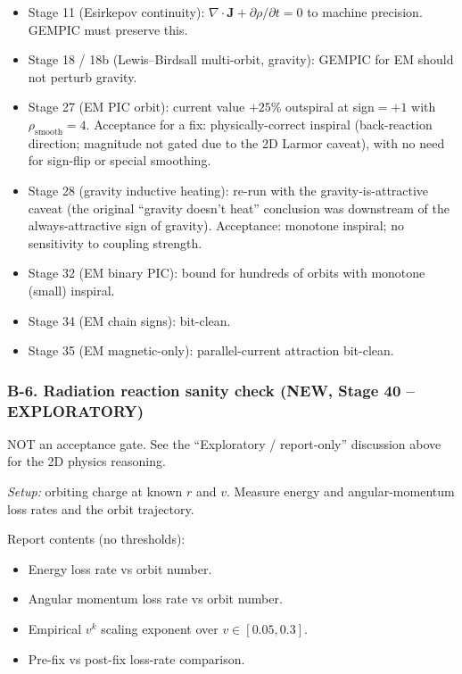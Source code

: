 \documentclass[11pt,a4paper]{article}
\newcommand{\vv}[1]{\mathbf{#1}}
\begin{document}
\begin{itemize}
  \item Stage 11 (Esirkepov continuity): $\nabla\cdot\vv{J} +
    \partial\rho/\partial t = 0$ to machine precision.  GEMPIC must
    preserve this.
  \item Stage 18 / 18b (Lewis--Birdsall multi-orbit, gravity):
    GEMPIC for EM should not perturb gravity.
  \item Stage 27 (EM PIC orbit): current value $+25\%$ outspiral at
    sign$=+1$ with $\rho_{\mathrm{smooth}}=4$.  Acceptance for a fix:
    physically-correct inspiral (back-reaction direction; magnitude
    not gated due to the 2D Larmor caveat), with no need for
    sign-flip or special smoothing.
  \item Stage 28 (gravity inductive heating): re-run with the
    gravity-is-attractive caveat (the original ``gravity doesn't
    heat'' conclusion was downstream of the always-attractive sign
    of gravity).  Acceptance: monotone inspiral; no sensitivity to
    coupling strength.
  \item Stage 32 (EM binary PIC): bound for hundreds of orbits with
    monotone (small) inspiral.
  \item Stage 34 (EM chain signs): bit-clean.
  \item Stage 35 (EM magnetic-only): parallel-current attraction
    bit-clean.
\end{itemize}

\subsubsection*{B-6.  Radiation reaction sanity check (NEW, Stage 40 -- EXPLORATORY)}

NOT an acceptance gate.  See the ``Exploratory / report-only''
discussion above for the 2D physics reasoning.

\emph{Setup:} orbiting charge at known $r$ and $v$.  Measure energy
and angular-momentum loss rates and the orbit trajectory.

Report contents (no thresholds):
\begin{itemize}
  \item Energy loss rate vs orbit number.
  \item Angular momentum loss rate vs orbit number.
  \item Empirical $v^k$ scaling exponent over $v \in [0.05, 0.3]$.
  \item Pre-fix vs post-fix loss-rate comparison.
\end{itemize}
\end{document}

